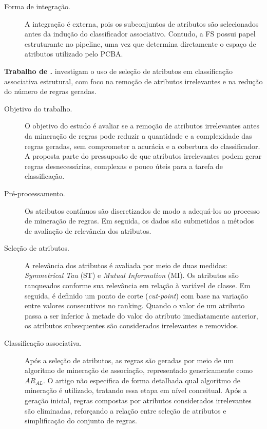 \begin{description}
    \item[Forma de integração.] A integração é externa, pois os subconjuntos de atributos são selecionados antes da indução do classificador associativo. Contudo, a FS possui papel estruturante no pipeline, uma vez que determina diretamente o espaço de atributos utilizado pelo PCBA.
\end{description}


\textbf{Trabalho de .} 
 investigam o uso de seleção de atributos em classificação associativa estrutural, com foco na remoção de atributos irrelevantes e na redução do número de regras geradas.

\begin{description}
    \item[Objetivo do trabalho.] O objetivo do estudo é avaliar se a remoção de atributos irrelevantes antes da mineração de regras pode reduzir a quantidade e a complexidade das regras geradas, sem comprometer a acurácia e a cobertura do classificador. A proposta parte do pressuposto de que atributos irrelevantes podem gerar regras desnecessárias, complexas e pouco úteis para a tarefa de classificação.

    \item[Pré-processamento.] Os atributos contínuos são discretizados de modo a adequá-los ao processo de mineração de regras. Em seguida, os dados são submetidos a métodos de avaliação de relevância dos atributos.

    \item[Seleção de atributos.] A relevância dos atributos é avaliada por meio de duas medidas: \textit{Symmetrical Tau} (ST) e \textit{Mutual Information} (MI). Os atributos são ranqueados conforme sua relevância em relação à variável de classe. Em seguida, é definido um ponto de corte (\textit{cut-point}) com base na variação entre valores consecutivos no ranking. Quando o valor de um atributo passa a ser inferior à metade do valor do atributo imediatamente anterior, os atributos subsequentes são considerados irrelevantes e removidos.

    \item[Classificação associativa.] Após a seleção de atributos, as regras são geradas por meio de um algoritmo de mineração de associação, representado genericamente como $AR_{AL}$. O artigo não especifica de forma detalhada qual algoritmo de mineração é utilizado, tratando essa etapa em nível conceitual. Após a geração inicial, regras compostas por atributos considerados irrelevantes são eliminadas, reforçando a relação entre seleção de atributos e simplificação do conjunto de regras.


\end{description}

